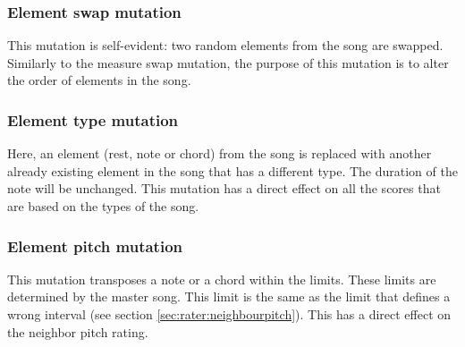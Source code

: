 
\subsubsection{Element swap mutation}
This mutation is self-evident: two random elements from the song are swapped. Similarly to the measure swap mutation, the purpose of this mutation is to alter the order of elements in the song.

\subsubsection{Element type mutation}
Here, an element (rest, note or chord) from the song is replaced with another already existing element in the song that has a different type. The duration of the note will be unchanged. This mutation has a direct effect on all the scores that are based on the types of the song.

\subsubsection{Element pitch mutation}
This mutation  transposes a note or a chord within the limits. These limits are determined by the master song. This limit is the same as the limit that defines a wrong interval (see section \ref{sec:rater:neighbourpitch}). This has a direct effect on the neighbor pitch rating.
